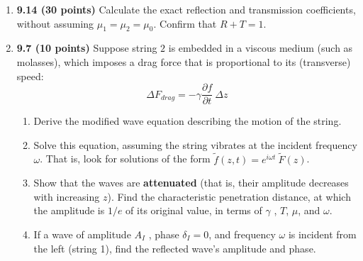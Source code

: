 \documentclass[fleqn]{article}
\begin{document}
\begin{enumerate}


    \item \textbf{9.14 (30 points)} Calculate the exact reflection and transmission coefficients, without assuming $\mu_1=\mu_2=\mu_0$. 
    Confirm that $R+T=1$.



    \item \textbf{9.7 (10 points)} Suppose string $2$ is embedded in a viscous medium (such as molasses), which imposes a drag force 
    that is proportional to its (transverse) speed:
    $$
      \Delta F_{drag}=-\gamma \dfrac{\partial f}{\partial t} ~ \Delta z
    $$
    \begin{enumerate}
      \item Derive the modified wave equation describing the motion of the string.


      \item Solve this equation, assuming the string vibrates at the incident frequency $\omega$. That is, look for solutions of the
      form $\tilde{f}(z,t)=e^{i \omega t} ~ \tilde{F}(z)$.


      \item Show that the waves are \textbf{attenuated} (that is, their amplitude decreases with increasing $z$). Find the characteristic penetration distance, at which the amplitude
      is $1/e$ of its original value, in terms of $\gamma$ , $T$, $\mu$, and $\omega$.


      \item If a wave of amplitude $A_I$ , phase $\delta_I=0$, and frequency $\omega$ is incident from the left (string 1), find the reflected wave’s
      amplitude and phase.


    \end{enumerate}


  \end{enumerate}
\end{document}

